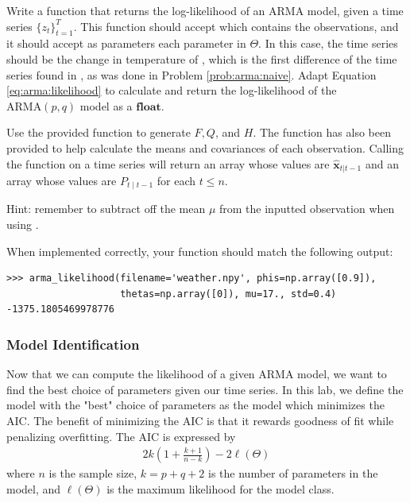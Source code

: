 \begin{problem}
\label{prob:arma:likelihood}
Write a function  that returns the log-likelihood of an ARMA model, given a time series $\{z_t\}_{t=1}^T$.
This function should accept  which contains the observations, and it should accept as parameters each parameter in $\Theta$. 
In this case, the time series should be the change in temperature of , which is the first difference of the time series found in , as was done in Problem \ref{prob:arma:naive}.
Adapt Equation \ref{eq:arma:likelihood} to calculate and return the log-likelihood of the $\text{ARMA}(p,q)$ model as a $\mathbf{float}$.

Use the provided  function to generate $F,Q$, and $H$.
The function  has also been provided to help calculate the means and covariances of each observation.
Calling the function  on a time series will return an array whose values are $\hat{\textbf{x}}_{t|t-1}$ and an array whose values are $P_{t\mid t-1}$ for each $t\leq n$.

\noindent Hint: remember to subtract off the mean $\mu$ from the inputted observation when using .

When implemented correctly, your function should match the following output:
\begin{lstlisting}
>>> arma_likelihood(filename='weather.npy', phis=np.array([0.9]), 
                    thetas=np.array([0]), mu=17., std=0.4)
-1375.1805469978776
\end{lstlisting}
\end{problem}

\subsubsection*{Model Identification}

Now that we can compute the likelihood of a given ARMA model, we want to find the best choice of parameters given our time series.
In this lab, we define the model with the "best" choice of parameters as the model which minimizes the AIC.
The benefit of minimizing the AIC is that it rewards goodness of fit while penalizing overfitting.
The AIC is expressed by
\begin{align}
\label{eq:AIC:formula}
    2k\left(1 + \frac{k+1}{n-k}\right) - 2 \ell(\Theta)
\end{align}
where $n$ is the sample size, $k = p + q + 2$ is the number of parameters in
the model, and $\ell(\Theta)$ is the maximum likelihood for the model class.

